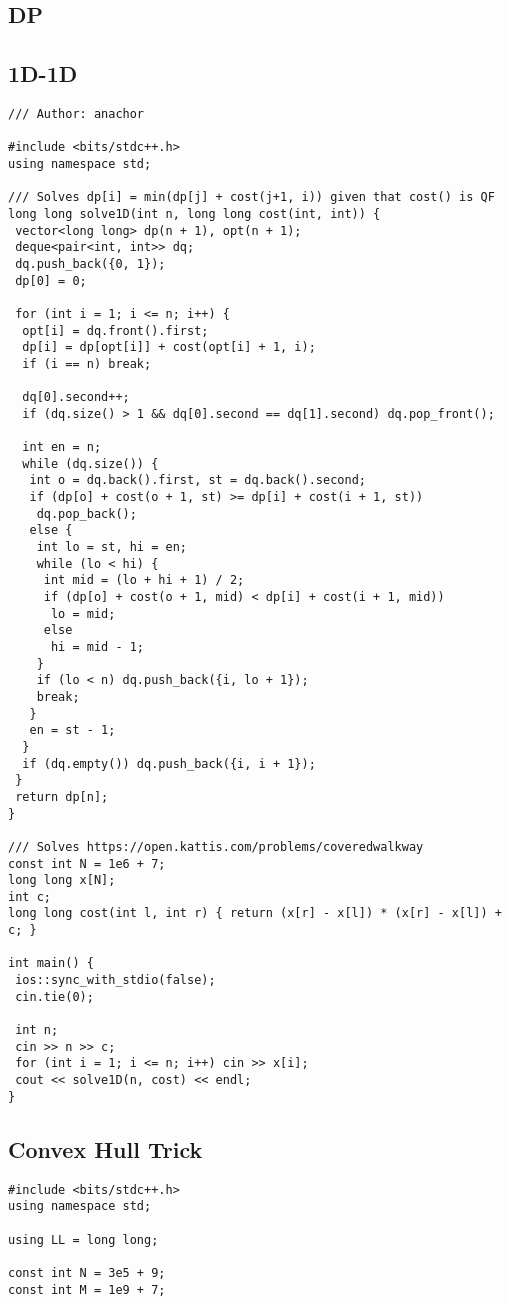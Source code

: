 \documentclass[a4paper,11pt,oneside]{article}
\begin{document}
\begin{multicols*}{\COLS}
\section{DP}
\subsection{1D-1D}
\begin{lstlisting}
/// Author: anachor

#include <bits/stdc++.h>
using namespace std;

/// Solves dp[i] = min(dp[j] + cost(j+1, i)) given that cost() is QF
long long solve1D(int n, long long cost(int, int)) {
 vector<long long> dp(n + 1), opt(n + 1);
 deque<pair<int, int>> dq;
 dq.push_back({0, 1});
 dp[0] = 0;

 for (int i = 1; i <= n; i++) {
  opt[i] = dq.front().first;
  dp[i] = dp[opt[i]] + cost(opt[i] + 1, i);
  if (i == n) break;

  dq[0].second++;
  if (dq.size() > 1 && dq[0].second == dq[1].second) dq.pop_front();

  int en = n;
  while (dq.size()) {
   int o = dq.back().first, st = dq.back().second;
   if (dp[o] + cost(o + 1, st) >= dp[i] + cost(i + 1, st))
    dq.pop_back();
   else {
    int lo = st, hi = en;
    while (lo < hi) {
     int mid = (lo + hi + 1) / 2;
     if (dp[o] + cost(o + 1, mid) < dp[i] + cost(i + 1, mid))
      lo = mid;
     else
      hi = mid - 1;
    }
    if (lo < n) dq.push_back({i, lo + 1});
    break;
   }
   en = st - 1;
  }
  if (dq.empty()) dq.push_back({i, i + 1});
 }
 return dp[n];
}

/// Solves https://open.kattis.com/problems/coveredwalkway
const int N = 1e6 + 7;
long long x[N];
int c;
long long cost(int l, int r) { return (x[r] - x[l]) * (x[r] - x[l]) + c; }

int main() {
 ios::sync_with_stdio(false);
 cin.tie(0);

 int n;
 cin >> n >> c;
 for (int i = 1; i <= n; i++) cin >> x[i];
 cout << solve1D(n, cost) << endl;
}
\end{lstlisting}
\subsection{Convex Hull Trick}
\begin{lstlisting}
#include <bits/stdc++.h>
using namespace std;

using LL = long long;

const int N = 3e5 + 9;
const int M = 1e9 + 7;


\end{lstlisting}
\end{multicols*}
\end{document}
